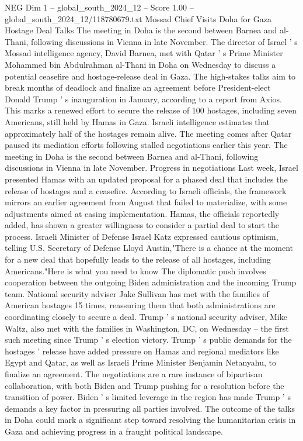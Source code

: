 \begin{textsample}{NEG Dim 1 – global\_south\_2024\_12 – Score 1.00 – global\_south\_2024\_12/118780679.txt}  \label{ex:f1_neg_345}
Mossad Chief Visits Doha for Gaza Hostage Deal Talks The meeting in Doha is the second between Barnea and al-Thani, following discussions in Vienna in late November.
The director of Israel ' s Mossad intelligence agency, David Barnea, met with Qatar ' s Prime Minister Mohammed bin Abdulrahman al-Thani in Doha on Wednesday to discuss a potential ceasefire and hostage-release deal in Gaza.
The high-stakes talks aim to break months of deadlock and finalize an agreement before President-elect Donald Trump ' s inauguration in January, according to a report from Axios.
This marks a renewed effort to secure the release of 100 hostages, including seven Americans, still held by Hamas in Gaza.
Israeli intelligence estimates that approximately half of the hostages remain alive.
The meeting comes after Qatar paused its mediation efforts following stalled negotiations earlier this year.
The meeting in Doha is the second between Barnea and al-Thani, following discussions in Vienna in late November.
Progress in negotiations Last week, Israel presented Hamas with an updated proposal for a phased deal that includes the release of hostages and a ceasefire.
According to Israeli officials, the framework mirrors an earlier agreement from August that failed to materialize, with some adjustments aimed at easing implementation.
Hamas, the officials reportedly added, has shown a greater willingness to consider a partial deal to start the process.
Israeli Minister of Defense Israel Katz expressed cautious optimism, telling U.S.
Secretary of Defense Lloyd Austin,"There is a chance at the moment for a new deal that hopefully leads to the release of all hostages, including Americans."Here is what you need to know The diplomatic push involves cooperation between the outgoing Biden administration and the incoming Trump team.
National security adviser Jake Sullivan has met with the families of American hostages 15 times, reassuring them that both administrations are coordinating closely to secure a deal.
Trump ' s national security adviser, Mike Waltz, also met with the families in Washington, DC, on Wednesday -- the first such meeting since Trump ' s election victory.
Trump ' s public demands for the hostages ' release have added pressure on Hamas and regional mediators like Egypt and Qatar, as well as Israeli Prime Minister Benjamin Netanyahu, to finalize an agreement.
The negotiations are a rare instance of bipartisan collaboration, with both Biden and Trump pushing for a resolution before the transition of power.
Biden ' s limited leverage in the region has made Trump ' s demands a key factor in pressuring all parties involved.
The outcome of the talks in Doha could mark a significant step toward resolving the humanitarian crisis in Gaza and achieving progress in a fraught political landscape.

\end{textsample}
